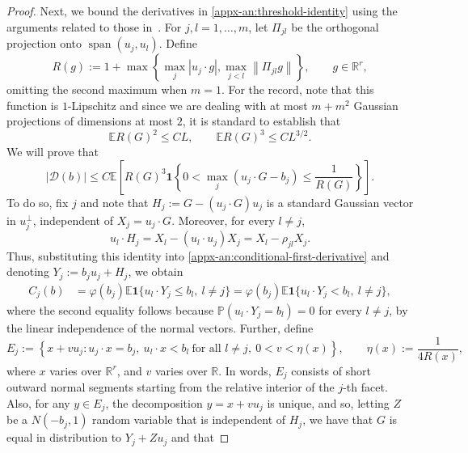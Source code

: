 \documentclass[11pt,letterpaper]{article}
\theoremstyle{remark}
\newcommand{\E}{\mathbb E}
\newcommand{\Pp}{\mathbb P}
\newcommand{\R}{\mathbb R}
\newcommand{\norm}[1]{\left\lVert#1\right\rVert}
\newcommand{\ind}{\mathbf 1}
\begin{document}
\begin{proof}
Next, we bound the derivatives in \eqref{appx-an:threshold-identity} using the arguments related to those in~\cite{Nazarov2003,CCK17N}. For $j, l=1,\dots, m$, let \(\Pi_{j l}\) be the orthogonal projection onto \(\operatorname{span}(u_j, u_l)\). Define
\begin{equation}
 R(g):=1+\max\left\{\max_j|u_j\cdot g|,
                          \max_{j<l}\norm{\Pi_{jl}g}\right\},\qquad g\in\R^r,
 \label{appx-an:projection-radius}
\end{equation}
omitting the second maximum when \(m=1\).
For the record, note that this function is \(1\)-Lipschitz and since we are dealing with at most \(m+m^2\)
Gaussian projections of dimensions at most \(2\), it is standard to establish that
\begin{equation}
 \E R(G)^2\le CL,\qquad \E R(G)^3\le CL^{3/2}.
 \label{appx-an:projection-moments}
\end{equation}
We will prove that
\begin{equation}
 |\mathcal D(b)|
 \le C\E\left[
 R(G)^3\ind\left\{0<\max_j(u_j\cdot G-b_j)
 \le\frac1{R(G)}\right\}
 \right].
 \label{appx-an:adaptive-layer}
\end{equation}
To do so, fix \(j\) and note that
\(
H_j:=G-(u_j\cdot G)u_j
\)
is a standard Gaussian vector in \(u_j^\perp\), independent
of \(X_j=u_j\cdot G\). Moreover, for every \(l\ne j\),
\[
u_l\cdot H_j
=X_l-(u_l\cdot u_j)X_j
=X_l-\rho_{jl}X_j.
\]
Thus, substituting this identity into \eqref{appx-an:conditional-first-derivative} and denoting \(Y_j:=b_ju_j+H_j\), we obtain
\begin{equation}
\begin{aligned}
C_j(b)
&=\varphi(b_j)
\E\ind\{u_l\cdot Y_j\le b_l,\ l\ne j\}=\varphi(b_j)
\E\ind\{u_l\cdot Y_j<b_l,\ l\ne j\},
\end{aligned}
\label{appx-an:one-density}
\end{equation}
where the second equality follows because
\(\Pp(u_l\cdot Y_j=b_l)=0\) for every \(l\ne j\),
by the linear independence of the normal vectors. Further, define
\[
E_j:=\left\{
x+vu_j:
u_j\cdot x=b_j,\
u_l\cdot x<b_l\ \text{for all }l\ne j,\ 
0<v<\eta(x)
\right\},
\qquad
\eta(x):=\frac1{4R(x)},
\]
where $x$ varies over $\R^r$, and $v$ varies over $\R$.
In words, \(E_j\) consists of short outward normal segments
starting from the relative interior of the \(j\)-th facet. Also, for any $y\in E_j$, the decomposition $y = x+ vu_j$ is unique, and so, letting $Z$ be a $N(-b_j,1)$ random variable that is independent of $H_j$, we have that $G$ is equal in distribution to $Y_j + Zu_j$ and that

\end{proof}
\end{document}
